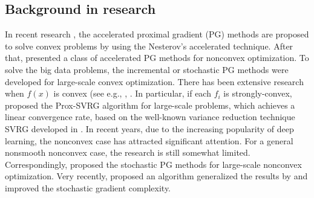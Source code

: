 \documentclass{article}
\theoremstyle{definition}
\theoremstyle{remark}
\begin{document}
\subsection{Background in research}
{\color{Green}
In recent research \cite{beck2009fast},
the accelerated proximal gradient (PG) methods are proposed to solve convex problems by using the Nesterov's accelerated technique. After that, \cite{li2015accelerated} presented a class of accelerated PG methods for nonconvex optimization.  To solve the big data problems, the incremental or stochastic PG methods \cite{bertsekas2011incremental,xiao2014proximal} were developed for large-scale convex optimization. 
}
{\color{Violet}
There has been extensive research when $f(x)$ is convex (see e.g., {  
\cite{nesterov2013gradient}}, \cite{xiao2014proximal,defazio2014saga,lan2017optimal,allen2017katyusha}. In particular, if each $f_i$ is strongly-convex, \cite{xiao2014proximal} proposed the Prox-SVRG algorithm {\color{green} for large-scale problems}, which achieves a linear convergence rate, based on the well-known variance reduction technique SVRG
developed in \cite{johnson2013accelerating}. In recent years, due to the increasing popularity of deep learning, the nonconvex case has attracted significant attention. For a general nonsmooth nonconvex case, the research is still somewhat limited. {\color{Green} Correspondingly, \cite{ghadimi2016accelerated,reddi2016proximal} proposed the stochastic PG methods for large-scale nonconvex optimization.}
Very recently, \cite{li2018simple} proposed an algorithm generalized the results by \cite{reddi2016proximal} and improved the stochastic gradient complexity. 
}
\end{document}
